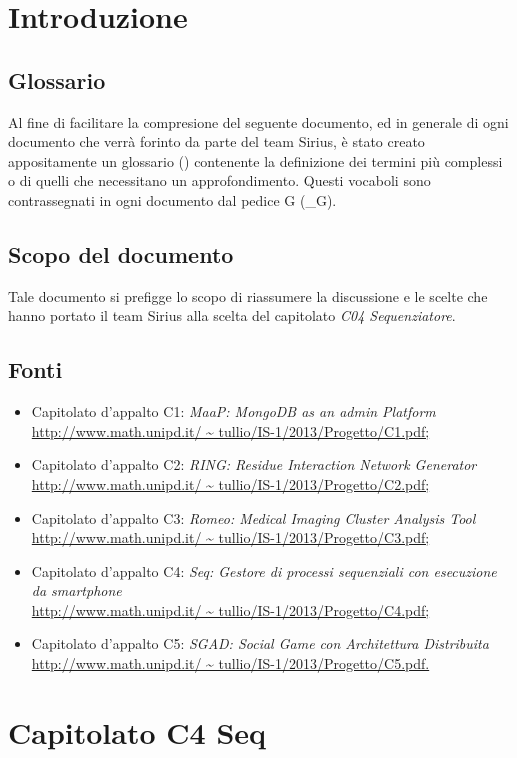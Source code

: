 \section{Introduzione}
\subsection{Glossario}
Al fine di facilitare la compresione del seguente documento, ed in generale di ogni documento che verrà forinto da parte del team Sirius, è stato creato appositamente un glossario () contenente la definizione dei termini più complessi o di quelli che necessitano un approfondimento.
Questi vocaboli sono contrassegnati in ogni documento dal pedice G (_G).
\subsection{Scopo del documento}
Tale documento si prefigge lo scopo di riassumere la discussione e le scelte che hanno portato il team Sirius alla scelta del capitolato \textit{C04 Sequenziatore}.
\subsection{Fonti}
\begin{itemize}
\item Capitolato d'appalto C1:\textit{ MaaP: MongoDB as an admin Platform} \\
\url{http://www.math.unipd.it/ ~ tullio/IS-1/2013/Progetto/C1.pdf;}
\item  Capitolato d'appalto C2: \textit{RING: Residue Interaction Network Generator}\\
\url{http://www.math.unipd.it/ ~ tullio/IS-1/2013/Progetto/C2.pdf;}
\item  Capitolato d'appalto C3: \textit{Romeo: Medical Imaging Cluster Analysis Tool}\\
\url{http://www.math.unipd.it/ ~ tullio/IS-1/2013/Progetto/C3.pdf;}
\item Capitolato d'appalto C4: \textit{Seq: Gestore di processi sequenziali con esecuzione da smartphone}\\
\url{http://www.math.unipd.it/ ~ tullio/IS-1/2013/Progetto/C4.pdf;}
\item Capitolato d'appalto C5:  \textit{SGAD: Social Game con Architettura Distribuita}
\url{http://www.math.unipd.it/ ~ tullio/IS-1/2013/Progetto/C5.pdf.}
\end{itemize}
\section{Capitolato C4 Seq}
